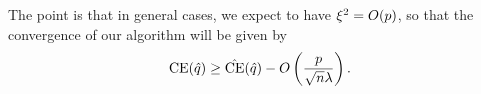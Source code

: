 The point is that in general cases, we expect to have $\xi^2 =O(p)$, so that the
convergence of our algorithm will be given by 
\[
  \operatorname{CE}(\hat q) \geq \hat{\operatorname{CE}}(\hat q) - O\left(\frac{p}{\sqrt{n}\lambda}\right).
\]

